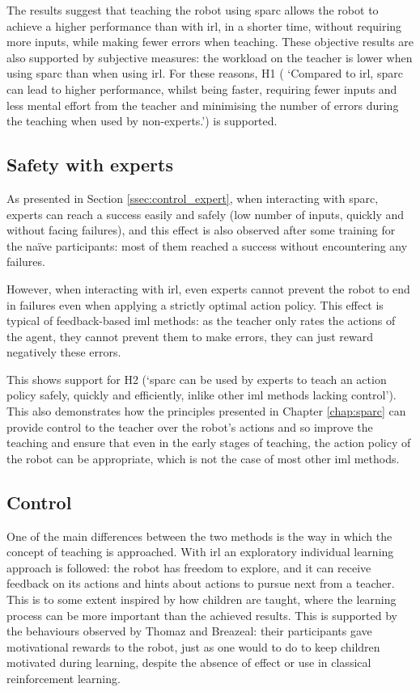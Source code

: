 The results suggest that teaching the robot using \gls{sparc} allows the robot to achieve a higher performance than with \gls{irl}, in a shorter time, without requiring more inputs, while making fewer errors when teaching. These objective results are also supported by subjective measures: the workload on the teacher is lower when using \gls{sparc} than when using \gls{irl}. For these reasons, H1 ( `Compared to \gls{irl}, \gls{sparc} can lead to higher performance, whilst being faster, requiring fewer inputs and less mental effort from the teacher and minimising the number of errors during the teaching when used by non-experts.') is supported.

\subsection{Safety with experts}

As presented in Section \ref{ssec:control_expert}, when interacting with \gls{sparc}, experts can reach a success easily and safely (low number of inputs, quickly and without facing failures), and this effect is also observed after some training for the naïve participants: most of them reached a success without encountering any failures.

However, when interacting with \gls{irl}, even experts cannot prevent the robot to end in failures even when applying a strictly optimal action policy. This effect is typical of feedback-based \gls{iml} methods: as the teacher only rates the actions of the agent, they cannot prevent them to make errors, they can just reward negatively these errors.

This shows support for H2 (`\gls{sparc} can be used by experts to teach an action policy safely, quickly and efficiently, inlike other \gls{iml} methods lacking control'). This also demonstrates how the principles presented in Chapter \ref{chap:sparc} can provide control to the teacher over the robot's actions and so improve the teaching and ensure that even in the early stages of teaching, the action policy of the robot can be appropriate, which is not the case of most other \gls{iml} methods.

\subsection{Control}
\label{sec:control}

One of the main differences between the two methods is the way in which the concept of teaching is approached. With \gls{irl} an exploratory individual learning approach is followed: the robot has freedom to explore, and it can receive feedback on its actions and hints about actions to pursue next from a teacher. This is to some extent inspired by how children are taught, where the learning process can be more important than the achieved results. This is supported by the behaviours observed by Thomaz and Breazeal: their participants gave motivational rewards to the robot, just as one would to do to keep children motivated during learning, despite the absence of effect or use in classical reinforcement learning.

